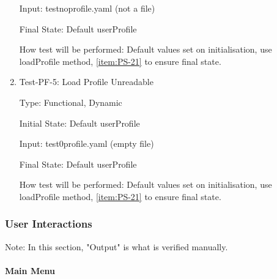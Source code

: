 \documentclass[12pt, titlepage]{article}
\makeatletter
\def\itemlabel#1#2{\def\@currentlabel{#2}\phantomsection\label{#1}}
\makeatother
\begin{document}
\begin{enumerate}
Input: testnoprofile.yaml (not a file)

Final State: Default userProfile

How test will be performed: Default values set on initialisation, use loadProfile method, \ref{item:PS-21} to ensure final state.
\item{Test-PF-5: Load Profile Unreadable\\}

Type: Functional, Dynamic

Initial State: Default userProfile
	
Input: test0profile.yaml (empty file)

Final State: Default userProfile

How test will be performed: Default values set on initialisation, use loadProfile method, \ref{item:PS-21} to ensure final state.

\end{enumerate}

\subsubsection{User Interactions}

Note: In this section, "Output" is what is verified manually.
		
\paragraph{Main Menu} \itemlabel{para:MM}{MM Tests} %
\end{document}
